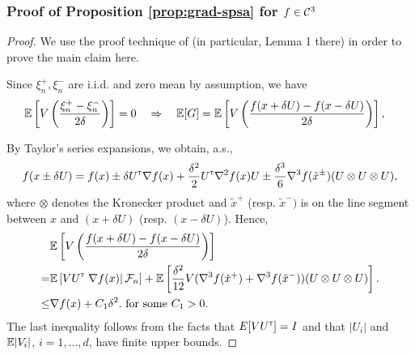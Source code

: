 \subsubsection*{Proof of Proposition \ref{prop:grad-spsa} for $f \in \mathcal{C}^3$}
\begin{proof}
We use the proof technique of \cite{spall1992multivariate} (in particular, Lemma 1 there) in order to prove the main claim here.
  
Since $\xi_n^+, \xi_n^-$ are i.i.d. and zero mean by assumption, we have
\begin{align*}
&\mathbb{E}\left[  V\left(\dfrac{\xi_n^+ - \xi_n^-}{2\delta}\right) \right]= 0 \quad \Rightarrow \quad
\mathbb{E}[G] =  \mathbb{E}\left[ V \left(\dfrac{f(x+\delta U)  - f(x-\delta U) }{2\delta}\right)\right],
\end{align*}

By Taylor's series expansions, we obtain, a.s.,
\begin{align*}
f(x \pm \delta U) = f(x) \pm \delta U^\mathsf{\scriptscriptstyle T} \nabla f(x) + \frac{\delta^2}{2} U^\mathsf{\scriptscriptstyle T} \nabla^2 f(x) U \pm  \frac{\delta^3}{6} \nabla^3 f(\tilde x^{\pm})(U \otimes U \otimes U),
\end{align*}
where $\otimes$ denotes the Kronecker product and $\tilde x^+$ (resp. $\tilde x^-)$ is on the line segment between $x$ and $(x + \delta U)$ (resp. $(x - \delta U)$).
Hence,
\begin{align}
&\mathbb{E}\left[V\left(\dfrac{f(x+\delta U) - f(x-\delta U)}{2\delta}\right) \right] \nonumber\\
= &\mathbb{E}\left[V U^\mathsf{\scriptscriptstyle T} \left.\nabla f(x)\right| \mathcal{F}_n\right]  +   \mathbb{E}\left[\frac{\delta^2}{12} V (\nabla^3 f(\tilde  x^+)+\nabla^3 f(\tilde  x^-))(U \otimes U \otimes U)\right]. \label{eq:l1}\\
\le & \nabla f(x) +  C_1 \delta^2.\label{eq:l2} \text{ for some } C_1>0.
\end{align}
The last inequality follows from the facts that $E[V U^\mathsf{\scriptscriptstyle T}] = I$ and that $|U_i|$ and $\mathbb{E}|V_i|$, $i=1,\ldots,d$, have finite upper bounds.


\end{proof}
